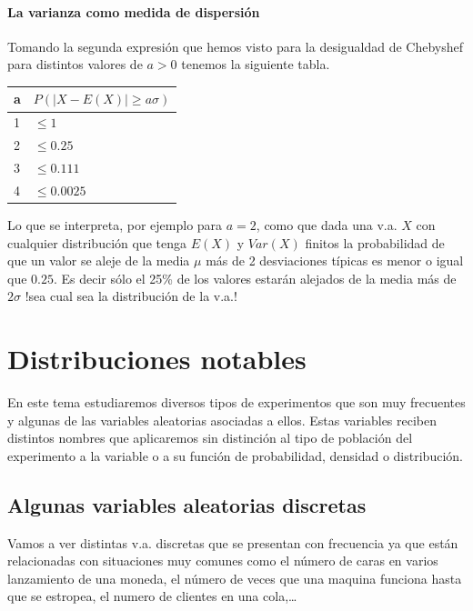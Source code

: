 \documentclass[12pt]{report}
\begin{document}
\subsubsection{La varianza como medida de dispersión}
         Tomando la segunda expresión que hemos visto para la desigualdad de
         Chebyshef para distintos valores de $a>0$ tenemos la siguiente tabla.
\begin{center}
         \begin{tabular}{l|l}
             a & $P(|X-E(X)|\geq a \sigma)$\\
             \hline
             1 & $\leq 1$ \\
             2 & $\leq 0.25$ \\
             3 & $\leq 0.111$ \\
             4 & $\leq 0.0025$
             \end{tabular}
\end{center}
             Lo que se interpreta, por ejemplo para $a=2$,  como
             que dada una v.a. $X$ con cualquier distribución
             que tenga $E(X)$ y $Var(X)$ finitos
            la  pro\-ba\-bi\-li\-dad de que un valor se aleje de la media $\mu$ más de
             2 desviaciones típicas es menor o igual que $0.25$. Es decir
             sólo el 25\% de los valores estarán alejados de la media
             más de $2\sigma$  !sea cual sea la distribución de la v.a.!
\chapter{Distribuciones notables}

En este tema estudiaremos diversos tipos de experimentos que son muy frecuentes y algunas
de las variables aleatorias asociadas a ellos. Estas variables reciben distintos nombres
que aplicaremos sin distinción al tipo de población del experimento a la variable o a su
función de probabilidad, densidad o distribución.

 \section{Algunas variables aleatorias discretas}

Vamos a ver distintas v.a. discretas que se presentan con frecuencia ya que están
relacionadas con situaciones muy comunes como el número de caras en varios lanzamiento de
una moneda, el número de veces que una maquina funciona hasta que se estropea, el numero de
clientes en una cola,\ldots
\end{document}
